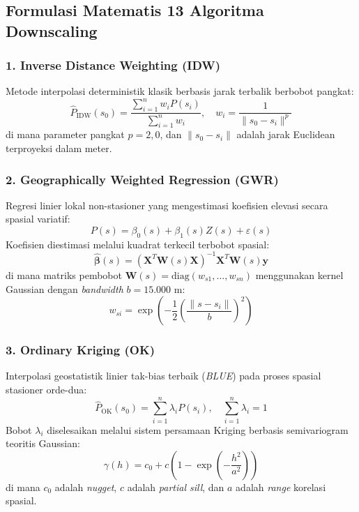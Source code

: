 \documentclass[11pt,a4paper]{article}
\begin{document}
\subsection{Formulasi Matematis 13 Algoritma Downscaling}

\subsubsection{1. Inverse Distance Weighting (IDW)}
Metode interpolasi deterministik klasik berbasis jarak terbalik berbobot pangkat:
\begin{equation}
    \hat{P}_{\text{IDW}}(s_0) = \frac{\sum_{i=1}^n w_i P(s_i)}{\sum_{i=1}^n w_i}, \quad w_i = \frac{1}{\|s_0 - s_i\|^p}
\end{equation}
di mana parameter pangkat $p = 2,0$, dan $\|s_0 - s_i\|$ adalah jarak Euclidean terproyeksi dalam meter.

\subsubsection{2. Geographically Weighted Regression (GWR)}
Regresi linier lokal non-stasioner yang mengestimasi koefisien elevasi secara spasial variatif:
\begin{equation}
    P(s) = \beta_0(s) + \beta_1(s) Z(s) + \varepsilon(s)
\end{equation}
Koefisien diestimasi melalui kuadrat terkecil terbobot spasial:
\begin{equation}
    \hat{\boldsymbol{\beta}}(s) = \left( \mathbf{X}^T \mathbf{W}(s) \mathbf{X} \right)^{-1} \mathbf{X}^T \mathbf{W}(s) \mathbf{y}
\end{equation}
di mana matriks pembobot $\mathbf{W}(s) = \text{diag}(w_{s1}, \dots, w_{sn})$ menggunakan kernel Gaussian dengan \textit{bandwidth} $b = 15.000\text{ m}$:
\begin{equation}
    w_{si} = \exp\left( -\frac{1}{2} \left(\frac{\|s - s_i\|}{b}\right)^2 \right)
\end{equation}

\subsubsection{3. Ordinary Kriging (OK)}
Interpolasi geostatistik linier tak-bias terbaik (\textit{BLUE}) pada proses spasial stasioner orde-dua:
\begin{equation}
    \hat{P}_{\text{OK}}(s_0) = \sum_{i=1}^n \lambda_i P(s_i), \quad \sum_{i=1}^n \lambda_i = 1
\end{equation}
Bobot $\lambda_i$ diselesaikan melalui sistem persamaan Kriging berbasis semivariogram teoritis Gaussian:
\begin{equation}
    \gamma(h) = c_0 + c \left( 1 - \exp\left(-\frac{h^2}{a^2}\right) \right)
\end{equation}
di mana $c_0$ adalah \textit{nugget}, $c$ adalah \textit{partial sill}, dan $a$ adalah \textit{range} korelasi spasial.
\end{document}

